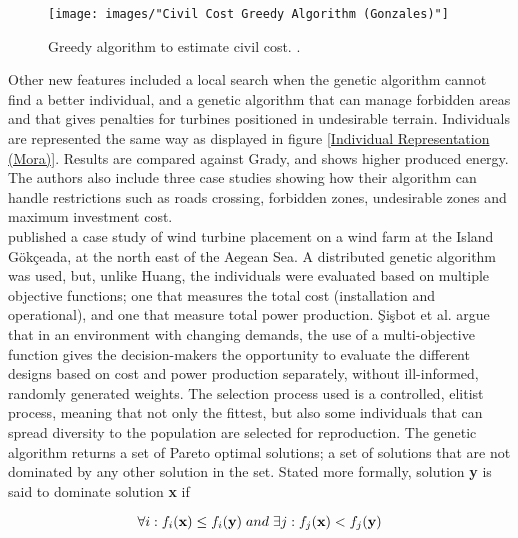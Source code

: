 \begin{figure}[h!]
\begin{center}
\texttt{[image: images/"Civil Cost Greedy Algorithm (Gonzales)"]}
\caption{Greedy algorithm to estimate civil cost. \citep{Gonzalez}.}
\label{Civil Cost Greedy Algorithm (Gonzales)}
\end{center}
\end{figure}


\noindent Other new features included a local search when the genetic algorithm cannot find a better individual, and a genetic algorithm that can manage forbidden areas and that gives penalties for turbines positioned in undesirable terrain. Individuals are represented the same way as \cite{Mora} displayed in figure \ref{Individual Representation (Mora)}. Results are compared against Grady, and shows higher produced energy. The authors also include three case studies showing how their algorithm can handle restrictions such as roads crossing, forbidden zones, undesirable zones and maximum investment cost.\\


\noindent \cite{Sisbot} published a case study of wind turbine placement on a wind farm at the Island G{\"o}k\c{c}eada, at the north east of the Aegean Sea. A distributed genetic algorithm was used, but, unlike Huang, the individuals were evaluated based on multiple objective functions; one that measures the total cost (installation and operational), and one that measure total power production. \c{S}i\c{s}bot et al. argue that in an environment with changing demands, the use of a multi-objective function gives the decision-makers the opportunity to evaluate the different designs based on cost and power production separately, without ill-informed, randomly generated weights. The selection process used is a controlled, elitist process, meaning that not only the fittest, but also some individuals that can spread diversity to the population are selected for reproduction. The genetic algorithm returns a set of Pareto optimal solutions; a set of solutions that are not dominated by any other solution in the set. Stated more formally, solution \textbf{y} is said to dominate solution \textbf{x} if

\begin{equation}
\forall i: f_i(\textbf{x}) \leq f_i(\textbf{y}) \hspace{1mm} and \hspace{1mm} \exists j: f_j(\textbf{x}) < f_j(\textbf{y}) 
\label{Dominated solutions}
\end{equation}

